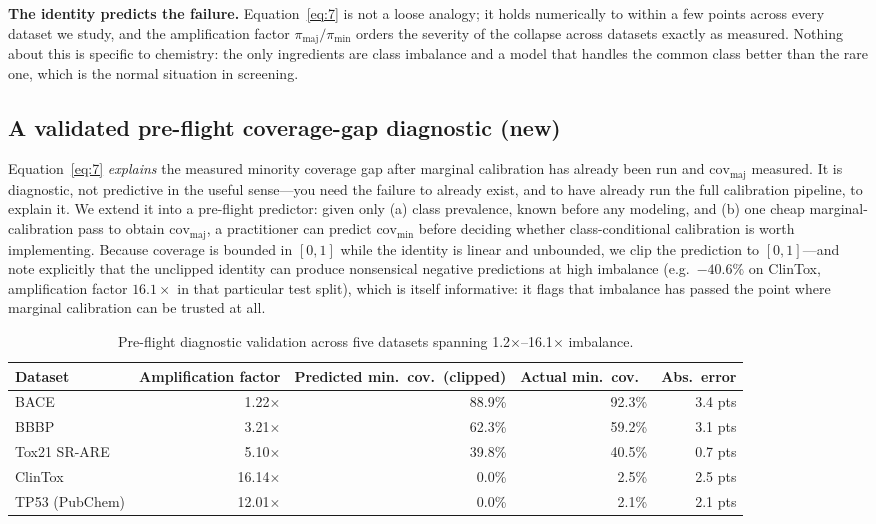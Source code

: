 \documentclass[11pt]{article}
\begin{document}
\textbf{The identity predicts the failure.} Equation~\ref{eq:7} is not a loose analogy; it holds
numerically to within a few points across every dataset we study, and the amplification factor
$\pi_{\mathrm{maj}}/\pi_{\min}$ orders the severity of the collapse across datasets exactly as
measured. Nothing about this is specific to chemistry: the only ingredients are class imbalance and
a model that handles the common class better than the rare one, which is the normal situation in
screening.

\subsection{A validated pre-flight coverage-gap diagnostic (new)}

Equation~\ref{eq:7} \emph{explains} the measured minority coverage gap after marginal calibration
has already been run and $\mathrm{cov}_{\mathrm{maj}}$ measured. It is diagnostic, not predictive
in the useful sense---you need the failure to already exist, and to have already run the full
calibration pipeline, to explain it. We extend it into a pre-flight predictor: given only (a) class
prevalence, known before any modeling, and (b) one cheap marginal-calibration pass to obtain
$\mathrm{cov}_{\mathrm{maj}}$, a practitioner can predict $\mathrm{cov}_{\min}$ before deciding
whether class-conditional calibration is worth implementing. Because coverage is bounded in
$[0,1]$ while the identity is linear and unbounded, we clip the prediction to $[0,1]$---and note
explicitly that the unclipped identity can produce nonsensical negative predictions at high
imbalance (e.g.\ $-40.6\%$ on ClinTox, amplification factor $16.1\times$ in that particular test
split), which is itself informative: it flags that imbalance has passed the point where marginal
calibration can be trusted at all.

\begin{table}[h]
\centering
\caption{Pre-flight diagnostic validation across five datasets spanning 1.2$\times$--16.1$\times$
imbalance.}
\label{tab:diagnostic}
\begin{tabular}{lrrrr}
\toprule
Dataset & Amplification factor & Predicted min.\ cov.\ (clipped) & Actual min.\ cov.\ & Abs.\ error \\
\midrule
BACE & 1.22$\times$ & 88.9\% & 92.3\% & 3.4 pts \\
BBBP & 3.21$\times$ & 62.3\% & 59.2\% & 3.1 pts \\
Tox21 SR-ARE & 5.10$\times$ & 39.8\% & 40.5\% & 0.7 pts \\
ClinTox & 16.14$\times$ & 0.0\% & 2.5\% & 2.5 pts \\
TP53 (PubChem) & 12.01$\times$ & 0.0\% & 2.1\% & 2.1 pts \\
\bottomrule
\end{tabular}
\end{table}
\end{document}
